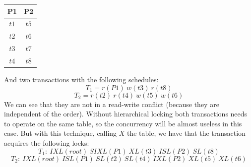 \begin{itemize}
\begin{example}
        \begin{table}[H]
            \centering
            \begin{tabular}{cc}
            \textbf{P1}                 & \textbf{P2}               \\ \hline
            \multicolumn{1}{|c|}{$t1$}  & \multicolumn{1}{c|}{$t5$} \\ \hline
            \multicolumn{1}{|c|}{$t2$}  & \multicolumn{1}{c|}{$t6$} \\ \hline
            \multicolumn{1}{|c|}{$t3$}  & \multicolumn{1}{c|}{$t7$} \\ \hline
            \multicolumn{1}{|c|}{$t4$}  & \multicolumn{1}{c|}{$t8$} \\ \hline
            \end{tabular}
        \end{table}
        And two transactions with the following schedules: 
        \[T_1=r(P1)\:w(t3)\:r(t8)\]
        \[T_2=r(t2)\:r(t4)\:w(t5)\:w(t6)\]
        We can see that they are not in a read-write conflict (because they are independent of the order). Without hierarchical locking both transactions needs to operate on the 
        same table, so the concurrency will be almost useless in this case. But with this technique, calling $X$ the table, we have that the transaction acquires the following
        locks: 
        \[T_1:\:IXL(root)\:SIXL(P1)\:XL(t3)\:ISL(P2)\:SL(t8)\]
        \[T_2:\:IXL(root)\:ISL(P1)\:SL(t2)\:SL(t4)\:IXL(P2)\:XL(t5)\:XL(t6)\]
    \end{example}
\end{itemize}